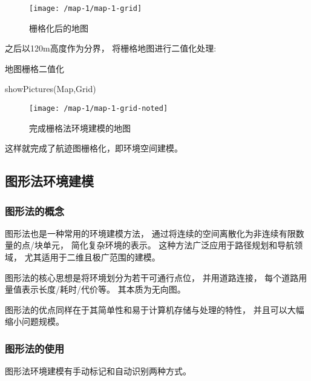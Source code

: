 \documentclass[oneside,UTF8]{ctexart}
\numberwithin{figure}{section} %
\begin{document}
\begin{figure}[H]
  \centering
  \texttt{[image: /map-1/map-1-grid]}
  \caption{栅格化后的地图}
  \label{fig:map-1-grid}
\end{figure}

之后以120m高度作为分界，
将栅格地图进行二值化处理:

\begin{algorithm}[H]
  \caption{地图栅格二值化}\label{algorithm-grid-noted}

  showPictures(Map,Grid)\;
\end{algorithm}

\begin{figure}[H]
  \centering
  \texttt{[image: /map-1/map-1-grid-noted]}
  \caption{完成栅格法环境建模的地图}
  \label{fig:map-1-grid-noted}
\end{figure}

这样就完成了航迹图栅格化，即环境空间建模。
\subsection{图形法环境建模}
\subsubsection{图形法的概念}
图形法也是一种常用的环境建模方法，
通过将连续的空间离散化为非连续有限数量的点/块单元，
简化复杂环境的表示。
这种方法广泛应用于路径规划和导航领域，
尤其适用于二维且极广范围的建模。

图形法的核心思想是将环境划分为若干可通行点位，
并用道路连接，
每个道路用量值表示长度/耗时/代价等。
其本质为无向图。

图形法的优点同样在于其简单性和易于计算机存储与处理的特性，
并且可以大幅缩小问题规模。
\subsubsection{图形法的使用}
图形法环境建模有手动标记和自动识别两种方式。
\end{document}
